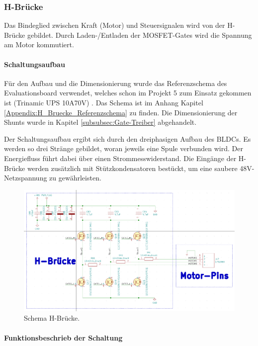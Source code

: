 \subsubsection{H-Brücke}
\label{subsubsec:H-Brücke}

Das Bindeglied zwischen Kraft (Motor) und Steuersignalen wird von der H-Brücke gebildet. Durch Laden-/Entladen der MOSFET-Gates wird die Spannung am Motor kommutiert.

\paragraph{Schaltungsaufbau}\mbox{}

Für den Aufbau und die Dimensionierung wurde das Referenzschema des Evaluationsboard verwendet, welches schon im Projekt 5 zum Einsatz gekommen ist (Trinamic UPS 10A70V) \cite{trinamicmotion_control_gmbh__co_kg_tmc-ups-xaxv-eval_2017}.  Das Schema ist im Anhang Kapitel \ref{Appendix:H_Bruecke_Referenzschema} zu finden. Die Dimensionierung der Shunts wurde in Kapitel \ref{subsubsec:Gate-Treiber} abgehandelt.

Der Schaltungsaufbau ergibt sich durch den dreiphasigen Aufbau des BLDCs. Es werden so drei Stränge gebildet, woran jeweils eine Spule verbunden wird. Der Energiefluss führt dabei über einen Strommesswiderstand. Die Eingänge der H-Brücke werden zusätzlich mit Stützkondensatoren bestückt, um eine saubere 48V-Netzspannung zu gewährleisten.

\begin{figure}[H]
	\centering
	\includegraphics[width=\textwidth]{graphics/Schema_H_Bruecke_und_BLDC}
	\caption{Schema H-Brücke.}
	\label{fig:Schema_H_Bruecke_und_BLDC}
\end{figure}

\paragraph{Funktionsbeschrieb der Schaltung}\mbox{}


